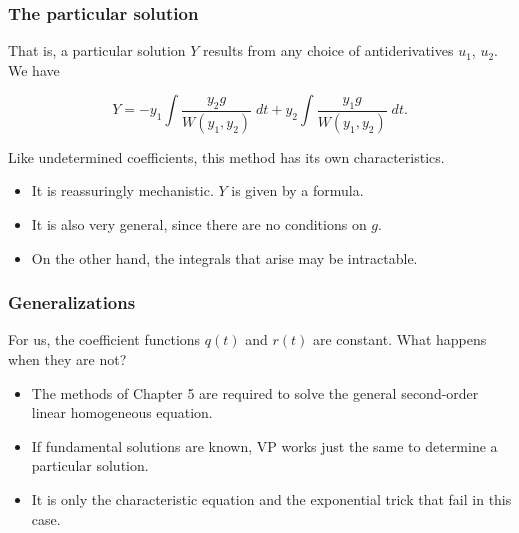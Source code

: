 \documentclass[11pt,ignorenonframetext,]{beamer}
\begin{document}
\begin{frame}\frametitle{The particular solution}

That is, a particular solution $Y$ results from any choice of
antiderivatives $u_1$, $u_2$. We have

\begin{equation*}
    Y = -y_1 \int \frac{y_2 g}{W(y_1, y_2)} \; dt + y_2 \int \frac{y_1 g}{W(y_1, y_2)} \; dt.
\end{equation*}

Like undetermined coefficients, this method has its own characteristics.

\begin{itemize}
\itemsep1pt\parskip0pt
\item
  It is reassuringly mechanistic. $Y$ is given by a formula.
\item
  It is also very general, since there are no conditions on $g$.
\item
  On the other hand, the integrals that arise may be intractable.
\end{itemize}

\end{frame}

\begin{frame}\frametitle{Generalizations}

For us, the coefficient functions $q(t)$ and $r(t)$ are constant. What
happens when they are not?

\begin{itemize}
\itemsep1pt\parskip0pt
\item
  The methods of Chapter 5 are required to solve the general
  second-order linear homogeneous equation.
\item
  If fundamental solutions are known, VP works just the same to
  determine a particular solution.
\item
  It is only the characteristic equation and the exponential trick that
  fail in this case.
\end{itemize}

\end{frame}
\end{document}
